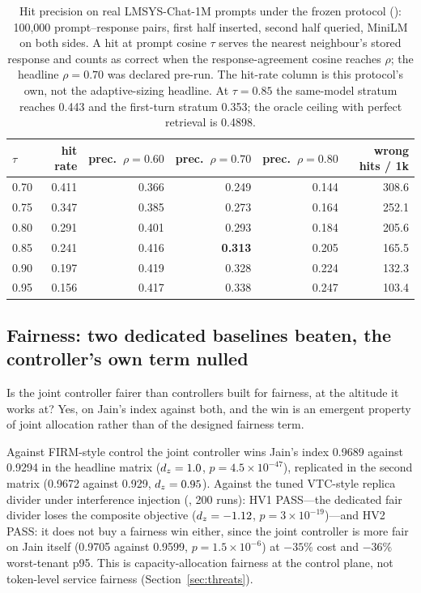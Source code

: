 \begin{table}[htbp]
\centering\tablefontsmall\setlength{\tabcolsep}{5pt}
\begin{tabular}{@{}lrrrrr@{}}
\toprule
$\tau$ & \textbf{hit rate} & \textbf{prec.}\ $\rho{=}0.60$ & \textbf{prec.}\ $\rho{=}0.70$ & \textbf{prec.}\ $\rho{=}0.80$ & \textbf{wrong hits / 1k} \\
\midrule
0.70 & 0.411 & 0.366 & 0.249 & 0.144 & 308.6 \\
0.75 & 0.347 & 0.385 & 0.273 & 0.164 & 252.1 \\
0.80 & 0.291 & 0.401 & 0.293 & 0.184 & 205.6 \\
0.85 & 0.241 & 0.416 & \textbf{0.313} & 0.205 & 165.5 \\
0.90 & 0.197 & 0.419 & 0.328 & 0.224 & 132.3 \\
0.95 & 0.156 & 0.417 & 0.338 & 0.247 & 103.4 \\
\bottomrule
\end{tabular}
\caption{Hit precision on real LMSYS-Chat-1M prompts under the frozen
protocol (): 100,000 prompt--response pairs,
first half inserted, second half queried, MiniLM on both sides. A hit at
prompt cosine $\tau$ serves the nearest neighbour's stored response and
counts as correct when the response-agreement cosine reaches $\rho$; the
headline $\rho = 0.70$ was declared pre-run. The hit-rate column is this
protocol's own, not the adaptive-sizing headline. At $\tau = 0.85$ the
same-model stratum reaches 0.443 and the first-turn stratum 0.353; the
oracle ceiling with perfect retrieval is 0.4898.}
\label{tab:precision}
\end{table}

\subsection{Fairness: two dedicated baselines beaten, the controller's own term nulled}
\label{sec:eval-fairness}

Is the joint controller fairer than controllers built for fairness, at
the altitude it works at? Yes, on Jain's index against both, and the win
is an emergent property of joint allocation rather than of the designed
fairness term.

Against FIRM-style control the joint controller wins Jain's index 0.9689
against 0.9294 in the headline matrix ($d_z = 1.0$, $p =
4.5{\times}10^{-47}$), replicated in the second matrix (0.9672 against
0.929, $d_z = 0.95$). Against the tuned VTC-style replica divider
\citep{vtc2024} under interference injection (, 200
runs): HV1 PASS---the dedicated fair divider loses the composite objective
($d_z = -1.12$, $p = 3{\times}10^{-19}$)---and HV2 PASS: it does not buy a
fairness win either, since the joint controller is more fair on Jain
itself (0.9705 against 0.9599, $p = 1.5{\times}10^{-6}$) at $-35\%$ cost and
$-36\%$ worst-tenant p95. This is capacity-allocation fairness at the
control plane, not token-level service fairness
(Section~\ref{sec:threats}).

